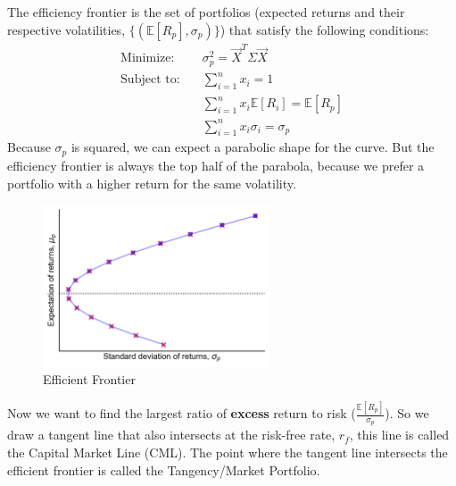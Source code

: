 \begin{definition}
    The efficiency frontier is the set of portfolios (expected returns and their respective volatilities, $\{(\mathbb{E}[R_p], \sigma_p)\}$) that satisfy the following conditions:
    \begin{align*}
        \text{Minimize:}   & \quad \sigma_p^2 = \overrightarrow{X}^T \Sigma \overrightarrow{X} \\
        \text{Subject to:} & \quad \sum_{i=1}^{n} x_i = 1                                      \\
                           & \quad \sum_{i=1}^{n} x_i \mathbb{E}[R_i] = \mathbb{E}[R_p]        \\
                           & \quad \sum_{i=1}^{n} x_i \sigma_i = \sigma_p
    \end{align*}
    Because $\sigma_p$ is squared, we can expect a parabolic shape for the curve. But the efficiency frontier is always the top half of the parabola, because we prefer a portfolio with a higher return for the same volatility.
\end{definition}
\begin{figure}[h!]
    \centering
    \includegraphics[width=0.6\textwidth]{LECTURE_4/efficient_frontier.png}
    \caption{Efficient Frontier}
    \label{fig:efficient_frontier}
\end{figure}

\begin{definition}
    Now we want to find the largest ratio of \textbf{excess} return to risk ($\frac{\mathbb{E}[R_p]}{\sigma_p}$).
    So we draw a tangent line that also intersects at the risk-free rate, $r_f$, this line is called the Capital Market Line (CML). The point where the tangent line intersects the efficient frontier is called the Tangency/Market Portfolio.\\
\end{definition}

